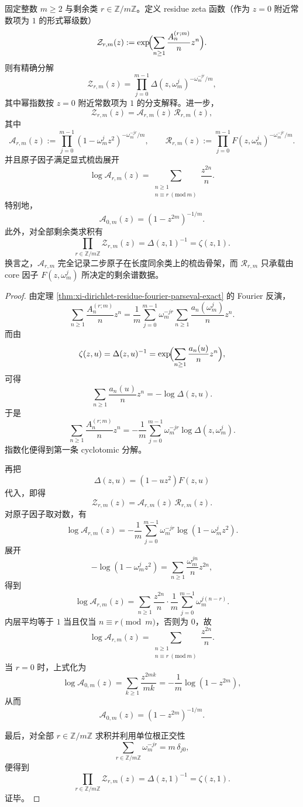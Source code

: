 \begin{theorem}\label{thm:xi-time-part50dc-residue-zeta-cyclotomic-witt}
固定整数 \(m\ge 2\) 与剩余类 \(r\in\mathbb Z/m\mathbb Z\)。定义 residue zeta 函数（作为 \(z=0\) 附近常数项为 \(1\) 的形式幂级数）
\[
\mathcal Z_{r,m}(z)
:=
\exp\!\Bigl(\sum_{n\ge 1}\frac{A_n^{(r;m)}}{n}z^n\Bigr).
\]
则有精确分解
\[
\mathcal Z_{r,m}(z)
=
\prod_{j=0}^{m-1}
\Delta(z,\omega_m^j)^{-\omega_m^{-jr}/m},
\]
其中幂指数按 \(z=0\) 附近常数项为 \(1\) 的分支解释。进一步，
\[
\mathcal Z_{r,m}(z)=\mathcal A_{r,m}(z)\,\mathcal R_{r,m}(z),
\]
其中
\[
\mathcal A_{r,m}(z)
:=
\prod_{j=0}^{m-1}(1-\omega_m^j z^2)^{-\omega_m^{-jr}/m},
\qquad
\mathcal R_{r,m}(z)
:=
\prod_{j=0}^{m-1}F(z,\omega_m^j)^{-\omega_m^{-jr}/m}.
\]
并且原子因子满足显式梳齿展开
\[
\log \mathcal A_{r,m}(z)
=
\sum_{\substack{n\ge 1\\ n\equiv r\ (\mathrm{mod}\ m)}}
\frac{z^{2n}}{n}.
\]
特别地，
\[
\mathcal A_{0,m}(z)=(1-z^{2m})^{-1/m}.
\]
此外，对全部剩余类求积有
\[
\prod_{r\in\mathbb Z/m\mathbb Z}\mathcal Z_{r,m}(z)
=
\Delta(z,1)^{-1}
=
\zeta(z,1).
\]
换言之，\(\mathcal A_{r,m}\) 完全记录二步原子在长度同余类上的梳齿骨架，而 \(\mathcal R_{r,m}\) 只承载由 core 因子 \(F(z,\omega_m^j)\) 所决定的剩余谱数据。
\end{theorem}
\begin{proof}
由定理 \ref{thm:xi-dirichlet-residue-fourier-parseval-exact} 的 Fourier 反演，
\[
\sum_{n\ge 1}\frac{A_n^{(r;m)}}{n}z^n
=
\frac1m\sum_{j=0}^{m-1}\omega_m^{-jr}
\sum_{n\ge 1}\frac{a_n(\omega_m^j)}{n}z^n.
\]
而由
\[
\zeta(z,u)=\Delta(z,u)^{-1}
=
\exp\!\Bigl(\sum_{n\ge 1}\frac{a_n(u)}{n}z^n\Bigr),
\]
可得
\[
\sum_{n\ge 1}\frac{a_n(u)}{n}z^n=-\log \Delta(z,u).
\]
于是
\[
\sum_{n\ge 1}\frac{A_n^{(r;m)}}{n}z^n
=
-\frac1m\sum_{j=0}^{m-1}\omega_m^{-jr}\log\Delta(z,\omega_m^j).
\]
指数化便得到第一条 cyclotomic 分解。

再把
\[
\Delta(z,u)=(1-uz^2)F(z,u)
\]
代入，即得
\[
\mathcal Z_{r,m}(z)=\mathcal A_{r,m}(z)\,\mathcal R_{r,m}(z).
\]
对原子因子取对数，有
\[
\log\mathcal A_{r,m}(z)
=
-\frac1m\sum_{j=0}^{m-1}\omega_m^{-jr}\log(1-\omega_m^j z^2).
\]
展开
\[
-\log(1-\omega_m^j z^2)
=
\sum_{n\ge 1}\frac{\omega_m^{jn}}{n}z^{2n},
\]
得到
\[
\log\mathcal A_{r,m}(z)
=
\sum_{n\ge 1}\frac{z^{2n}}{n}\cdot
\frac1m\sum_{j=0}^{m-1}\omega_m^{j(n-r)}.
\]
内层平均等于 \(1\) 当且仅当 \(n\equiv r\pmod m\)，否则为 \(0\)，故
\[
\log \mathcal A_{r,m}(z)
=
\sum_{\substack{n\ge 1\\ n\equiv r\ (\mathrm{mod}\ m)}}
\frac{z^{2n}}{n}.
\]
当 \(r=0\) 时，上式化为
\[
\log\mathcal A_{0,m}(z)
=
\sum_{k\ge 1}\frac{z^{2mk}}{mk}
=
-\frac1m\log(1-z^{2m}),
\]
从而
\[
\mathcal A_{0,m}(z)=(1-z^{2m})^{-1/m}.
\]

最后，对全部 \(r\in\mathbb Z/m\mathbb Z\) 求积并利用单位根正交性
\[
\sum_{r\in\mathbb Z/m\mathbb Z}\omega_m^{-jr}
=
m\,\delta_{j0},
\]
便得到
\[
\prod_{r\in\mathbb Z/m\mathbb Z}\mathcal Z_{r,m}(z)
=
\Delta(z,1)^{-1}
=
\zeta(z,1).
\]
证毕。
\end{proof}

\endinput
